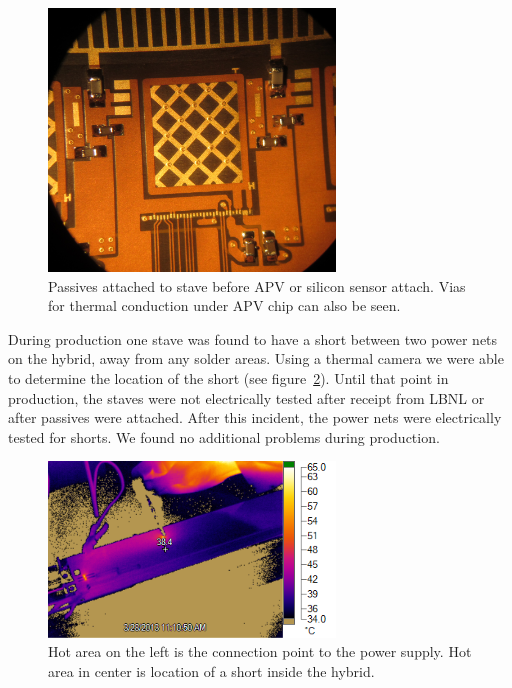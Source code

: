 \documentclass[1p,12pt]{elsarticle}
\begin{document}
\begin{figure}[h]
\begin{center}
\includegraphics[width=3in, keepaspectratio=true, angle=0]{graphics/passive.jpg}
\caption{Passives attached to stave before APV or silicon sensor attach.  Vias
for thermal conduction under APV chip can also be seen.
\label{fig:passive}}
\end{center}
\end{figure}
%
During production one stave was found to have a short between two power nets on
the hybrid, away from any solder areas. Using a thermal camera we were able to
determine the location of the short (see figure~\ref{fig:thermal}). Until that point in production, the staves were not
electrically tested after receipt from LBNL or after passives were attached.
After this incident, the power nets were electrically tested for shorts. We found no
additional problems during production.

\begin{figure}[h]
\begin{center}
\includegraphics[width=3in, keepaspectratio=true, angle=0]{graphics/ir_view.png}
\caption{Hot area on the left is the connection point to the power supply.  Hot area
in center is location of a short inside the hybrid.
\label{fig:thermal}}
\end{center}
\end{figure}
\end{document}
